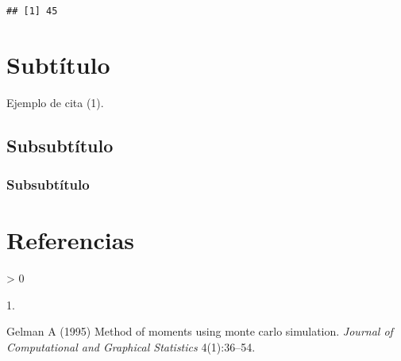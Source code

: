 \documentclass[9pt,twocolumn,twoside,]{pnas-new}
\newlength{\csllabelwidth}
\newlength{\cslhangindent}
\newenvironment{CSLReferences}[2] %
 {%
  \setlength{\parindent}{0pt}
  \ifodd #1 \everypar{\setlength{\hangindent}{\cslhangindent}}\ignorespaces\fi
  \ifnum #2 > 0
  \setlength{\parskip}{#2\baselineskip}
  \fi
 }%
 {}
\newcommand{\CSLLeftMargin}[1]{\parbox[t]{\csllabelwidth}{#1}}
\newcommand{\CSLRightInline}[1]{\parbox[t]{\linewidth - \csllabelwidth}{#1}\break}
\begin{document}
\begin{verbatim}
## [1] 45
\end{verbatim}

\hypertarget{subtuxedtulo}{%
\section*{Subtítulo}\label{subtuxedtulo}}

Ejemplo de cita (1).

\lipsum[2-4]

\hypertarget{subsubtuxedtulo}{%
\subsection*{Subsubtítulo}\label{subsubtuxedtulo}}

\lipsum[4-6]

\hypertarget{subsubtuxedtulo-1}{%
\subsubsection*{Subsubtítulo}\label{subsubtuxedtulo-1}}

\lipsum[6-8]

\hypertarget{referencias}{%
\section*{Referencias}\label{referencias}}

\showmatmethods
\showacknow
\pnasbreak

\hypertarget{refs}{}
\begin{CSLReferences}{0}{0}
\leavevmode\hypertarget{ref-mainArt}{}%
\CSLLeftMargin{1. }
\CSLRightInline{Gelman A (1995) Method of moments using monte carlo
simulation. \emph{Journal of Computational and Graphical Statistics}
4(1):36--54.}

\end{CSLReferences}



% 
\end{document}
